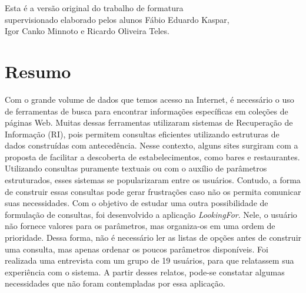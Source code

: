 \documentclass[11pt,oneside,a4paper]{book}
\begin{document}
    \vskip 2cm

    \begin{flushright}
	Esta é a versão original do trabalho de formatura \\ 
    supervisionado elaborado pelos alunos Fábio Eduardo Kaspar,  \\
    Igor Canko Minnoto e Ricardo Oliveira Teles.\\
    \end{flushright}

\pagebreak





 \chapter*{Resumo}


Com o grande volume de dados que temos acesso na Internet, é necessário o uso de ferramentas de busca para encontrar informações específicas em coleções de páginas Web. Muitas dessas ferramentas utilizaram sistemas de Recuperação de Informação (RI), pois permitem consultas eficientes utilizando estruturas de dados construídas com antecedência. Nesse contexto, alguns sites surgiram com a proposta de facilitar a descoberta de estabelecimentos, como bares e restaurantes. Utilizando consultas puramente textuais ou com o auxílio de parâmetros estruturados, esses sistemas se popularizaram entre os usuários. Contudo, a forma de construir essas consultas pode gerar frustrações caso não os permita comunicar suas necessidades. Com o objetivo de estudar uma outra possibilidade de formulação de consultas, foi desenvolvido a aplicação \emph{LookingFor}. Nele, o usuário não fornece valores para os parâmetros, mas organiza-os em uma ordem de prioridade. Dessa forma, não é necessário ler as listas de opções antes de construir uma consulta, mas apenas ordenar os poucos parâmetros disponíveis. Foi realizada uma entrevista com um grupo de 19 usuários, para que relatassem sua experiência com o sistema. A partir desses relatos, pode-se constatar algumas necessidades que não foram contempladas por essa aplicação.
\end{document}
